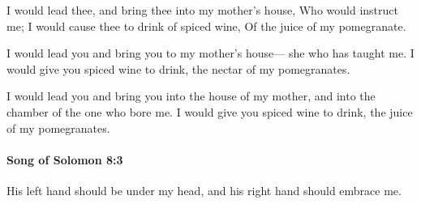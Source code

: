 			\begin{versebox}
					\item[BHS] 
					\item[LXX] 
					\item[ASV] I would lead thee, and bring thee into my mother's house, Who would instruct me; I would cause thee to drink of spiced wine, Of the juice of my pomegranate.
					\item[NIV] I would lead you and bring you to my mother’s house— she who has taught me. I would give you spiced wine to drink, the nectar of my pomegranates.
					\item[NRSV] I would lead you and bring you into the house of my mother, and into the chamber of the one who bore me. I would give you spiced wine to drink, the juice of my pomegranates.
			\end{versebox}

		\paragraph{Song of Solomon 8:3} %
			\label{SONGOFSOLOMON-8-3}

			His left hand should be under my head, and his right hand should embrace me.

